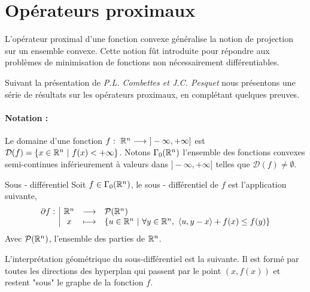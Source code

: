 \documentclass[a4paper,12pt]{article}
\begin{document}
\newpage
\section{Opérateurs proximaux}
\label{sec:prox}
L'opérateur proximal d'une fonction convexe généralise la notion de projection sur un ensemble convexe. Cette notion fût introduite pour répondre aux problèmes de minimisation de fonctions non nécessairement différentiables. 

Suivant la présentation de \emph{P.L. Combettes \emph{et} J.C. Pesquet} \cite{combettes} nous présentons une série de résultats sur les opérateurs proximaux, en complétant quelques preuves.
\paragraph{Notation :}Le domaine d'une fonction $f:\ \RR^n\longrightarrow\ ]-\infty,+\infty]$ est $\mathcal{D}(f) = \{ x\in\mathbb{R}^n\ |\ f(x) < +\infty \} $. Notons $\Gamma_0(\mathbb{R}^n)$ l'ensemble des fonctions convexes semi-continues inférieurement à valeurs dans $]-\infty,+\infty]$ telles que $\mathcal{D}(f) \neq \emptyset$. 

\begin{definition}{Sous - différentiel}
Soit $f\in\Gamma_0(\mathbb{R}^n)$, le sous - différentiel de $f$ est l'application suivante,
$$
\begin{array}[t]{l|ccl} \partial f: & \mathbb{R}^n & \longrightarrow & \mathcal{P}(\mathbb{R}^n) \\ & x & \longmapsto & \left\{ u\in\mathbb{R}^n\ |\ \forall y\in\mathbb{R}^n,\ \langle u,y-x\rangle +f(x)\leq f(y) \right\} \end{array}
$$ 
Avec $\mathcal{P}(\mathbb{R}^n)$, l'ensemble des parties de $\mathbb{R}^n$.
\end{definition}


L'interprétation géométrique du sous-différentiel est la suivante. Il est formé par toutes les directions des hyperplan qui passent par le point $(x,f(x))$ et restent "sous" le graphe de la fonction $f$. \\
\end{document}
